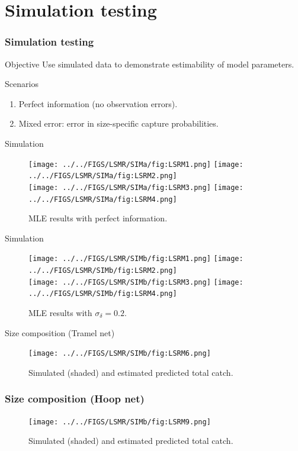 \documentclass{beamer}
\begin{document}
\section{Simulation testing} %
\label{sec:simulation_testing}


\begin{frame}
	\frametitle{Simulation testing}
	\begin{block} {Objective}
		Use simulated data to demonstrate estimability of model parameters.
	\end{block}
	\begin{block}{Scenarios}
		\begin{enumerate}
			\item Perfect information (no observation errors).
			\item Mixed error: error in size-specific capture probabilities.
		\end{enumerate}
	\end{block}
\end{frame}

\begin{frame}{Simulation}
	\begin{figure}[htbp]
		\centering
			\texttt{[image: ../../FIGS/LSMR/SIMa/fig:LSRM1.png]}
			\texttt{[image: ../../FIGS/LSMR/SIMa/fig:LSRM2.png]}\\
			\texttt{[image: ../../FIGS/LSMR/SIMa/fig:LSRM3.png]}
			\texttt{[image: ../../FIGS/LSMR/SIMa/fig:LSRM4.png]}
		\caption{MLE results with perfect information.}
		\label{fig:FIGS_LSMR_fig:LSRM1}
	\end{figure}	
\end{frame}

\begin{frame}{Simulation}
	\begin{figure}[htbp]
		\centering
			\texttt{[image: ../../FIGS/LSMR/SIMb/fig:LSRM1.png]}
			\texttt{[image: ../../FIGS/LSMR/SIMb/fig:LSRM2.png]}\\
			\texttt{[image: ../../FIGS/LSMR/SIMb/fig:LSRM3.png]}
			\texttt{[image: ../../FIGS/LSMR/SIMb/fig:LSRM4.png]}
		\caption{MLE results with $\sigma_\delta = 0.2$.}
		\label{fig:FIGS_LSMR_fig:LSRM1}
	\end{figure}	
\end{frame}

\begin{frame}{Size composition (Tramel net)}
	\only<1>
	{
		\begin{figure}[htbp]
			\centering
				\texttt{[image: ../../FIGS/LSMR/SIMb/fig:LSRM6.png]}
			\caption{Simulated (shaded) and estimated predicted total catch.}
			\label{fig:FIGS_LSMR_SIMb_fig:LSRM6}
		\end{figure}
	}
	{
	\frametitle{Size composition (Hoop net)}
		\begin{figure}[htbp]
			\centering
				\texttt{[image: ../../FIGS/LSMR/SIMb/fig:LSRM9.png]}
			\caption{Simulated (shaded) and estimated predicted total catch.}
			\label{fig:FIGS_LSMR_SIMb_fig:LSRM9}
		\end{figure}
	}
	
\end{frame}
\end{document}
